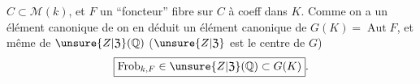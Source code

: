 $C\subset \mathcal{M}(k)$, et $F$ un ``foncteur'' fibre sur
$C$ à coeff dans $K$. Comme on a un élément
canonique de
on en déduit un élément canonique de
$G(K)=\operatorname{Aut}F$, et même de $\unsure{Z|\mathfrak Z}(\mathbb{Q})$
($\unsure{Z|\mathfrak Z}$ est le centre de $G$)
\[
 \boxed{\operatorname{Frob}_{k,F}\in
 \unsure{Z|\mathfrak Z}(\mathbb{Q})\subset G(K)}.
\]
